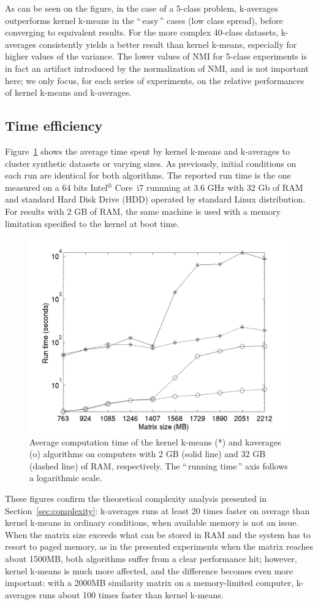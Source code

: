 \documentclass[natbib,smallextended]{svjour3}
\newcommand{\gl}[1]{``\,#1\,''} %
\begin{document}
As can be seen on the figure, in the case of a 5-class problem, k-averages outperforms kernel k-means in the \gl{easy} cases (low class spread), before converging to equivalent results. For the more complex 40-class datasets, k-averages consistently yields a better result than kernel k-means, especially for higher values of the variance. The lower values of NMI for 5-class experiments is in fact an artifact introduced by the normalization of NMI, and is not important here; we only focus, for each series of experiments, on the relative performances of kernel k-means and k-averages.

\subsection{Time efficiency}

Figure~\ref{fig:timing} shows the average time spent by kernel k-means and k-averages to cluster synthetic datasets or varying sizes. As previously, initial conditions on each run are identical for both algorithms. The reported run time is the one measured on a 64 bits Intel$^\circledR$ Core\texttrademark   \, i7 runnning at 3.6 GHz with 32 Gb of RAM and standard Hard Disk Drive (HDD)  operated by standard Linux distribution. For results with 2 GB of RAM, the same machine is used with a memory limitation specified to the kernel at boot time.

\begin{figure}
\center
\includegraphics[width= .7\textwidth]{figures/simpleSwap.png}
\caption{Average computation time of the kernel k-means (*) and kaverages (o) algorithms on computers with 2 GB (solid line) and 32 GB (dashed line) of RAM, respectively. The \gl{running time} axis follows a logarithmic scale.}
\label{fig:timing}
\end{figure}

These figures confirm the theoretical complexity analysis presented in Section~\ref{sec:complexity}: k-averages runs at least 20 times faster on average than kernel k-means in ordinary conditions, when  available memory is not an issue. When the matrix size exceeds what can be stored in RAM and the system has to resort to paged memory, as in the presented experiments when the matrix reaches about 1500MB, both algorithms suffer from a clear performance hit; however, kernel k-means is much more affected, and the difference becomes even more important: with a 2000MB similarity matrix on a memory-limited computer, k-averages runs about 100 times faster than kernel k-means.
\end{document}
